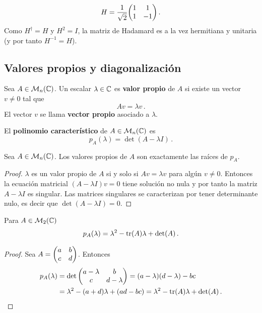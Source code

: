 \begin{eje}
  \[
    H = \frac{1}{\sqrt{2}}\mqty(1 & 1 \\ 1 & -1)\,.
  \]
  Como $H^\dagger=H$ y $H^2=I$, la matriz de Hadamard es a la vez hermitiana y unitaria (y por tanto $H^{-1}=H$).
\end{eje}

\subsection{Valores propios y diagonalización}

\begin{defi}
  Sea $A\in\mathcal{M}_n(\mathbb{C})$. Un escalar $\lambda\in\mathbb{C}$ es \textbf{valor propio} de $A$ si existe un vector $v\neq 0$ tal que
  \[
    Av = \lambda v\,.
  \]
  El vector $v$ se llama \textbf{vector propio} asociado a $\lambda$.
\end{defi}

\begin{defi}
  El \textbf{polinomio característico} de $A\in\mathcal{M}_n(\mathbb{C})$ es
  \[
    p_A(\lambda) = \det(A-\lambda I)\,.
  \]
\end{defi}
\begin{prop}
  Sea $A\in\mathcal{M}_n(\mathbb{C})$. Los valores propios de $A$ son exactamente las raíces de $p_A$.
\end{prop}
\begin{proof}
  $\lambda$ es un valor propio de $A$ si y solo si $Av=\lambda v$ para algún $v\neq 0$. Entonces la ecuación matricial $(A-\lambda I) v=0$ tiene solución no nula y por tanto la matriz $A-\lambda I$ es singular. Las matrices singulares se caracterizan por tener determinante nulo, es decir que $\det(A-\lambda I) = 0$.
\end{proof}

\begin{prop}
  Para $A\in\mathcal{M}_2(\mathbb{C})$
  \[
    p_A(\lambda) = \lambda^2 - \tr(A)\lambda + \det(A)\,.
  \]
\end{prop}
\begin{proof}
  Sea $A=\mqty(a&b\\c&d)$. Entonces
  \begin{align*}
    p_A(\lambda) & = \det\mqty(a-\lambda                                                 & b \\ c & d-\lambda) = (a-\lambda)(d-\lambda)-bc\\
                 & = \lambda^2-(a+d)\lambda+(ad-bc) = \lambda^2-\tr(A)\lambda+\det(A)\,.
  \end{align*}
\end{proof}

